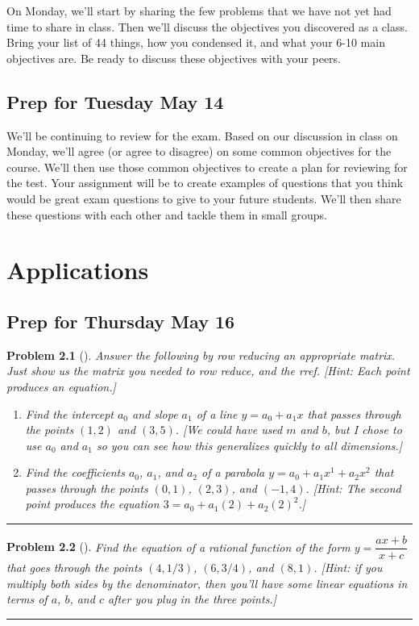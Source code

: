 \documentclass[letterpaper,oneside]{book}%
\theoremstyle{plain}
\theoremstyle{box}
\theoremstyle{problem}
\newtheorem{problemnum}{Problem}[chapter]
\newenvironment{problem}[1][]{\begin{problemnum}[#1]}{\end{problemnum}\nopagebreak\hrule\bigskip}
\begin{document}
On Monday, we'll start by sharing the few problems that we have not yet had time to share in class. Then we'll discuss the objectives you discovered as a class. Bring your list of 44 things, how you condensed it, and what your 6-10 main objectives are. Be ready to discuss these objectives with your peers. 

\section{Prep for Tuesday May 14}
We'll be continuing to review for the exam.  Based on our discussion in class on Monday, we'll agree (or agree to disagree) on some common objectives for the course. We'll then use those common objectives to create a plan for reviewing for the test.  Your assignment will be to create examples of questions that you think would be great exam questions to give to your future students.  We'll then share these questions with each other and tackle them in small groups. 

\chapter{Applications}
\section{Prep for Thursday May 16}





\begin{problem}
 Answer the following by row reducing an appropriate matrix. Just show us the matrix you needed to row reduce, and the rref. [Hint: Each point produces an equation.]
\begin{enumerate}
 \item Find the intercept $a_0$ and slope $a_1$ of a line $y = a_0+a_1 x$ that passes through the points $(1,2)$ and $(3,5)$. [We could have used $m$ and $b$, but I chose to use $a_0$ and $a_1$ so you can see how this generalizes quickly to all dimensions.]
 \item Find the coefficients $a_0$, $a_1$, and $a_2$ of a parabola $y = a_0+a_1 x^1+a_2x^2$ that passes through the points $(0, 1)$,  $(2, 3)$, and  $(−1, 4)$. [Hint: The second point produces the equation $3=a_0+a_1(2)+a_2(2)^2$.]
\end{enumerate}
\end{problem}



\begin{problem}
 Find the equation of a rational function of the form $y=\dfrac{ax+b}{x+c}$ that goes through the points $(4,1/3)$, $(6,3/4)$, and $(8,1)$. [Hint: if you multiply both sides by the denominator, then you'll have some linear equations in terms of $a$, $b$, and $c$ after you plug in the three points.]
\end{problem}
\end{document}
